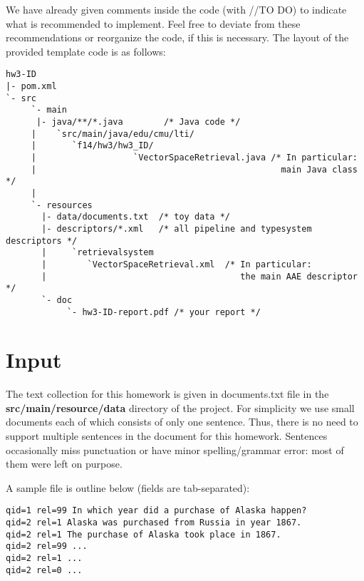 \documentclass[oneside,11pt]{memoir}
\begin{document}
We have already given comments inside the code (with //TO DO) to indicate what is recommended
to implement. Feel free to deviate from these recommendations
 or reorganize the code, if this is necessary.
The layout of the provided template code is as follows:

\vspace{2em}
\hspace{-3em}
\begin{minipage}{0.9\textwidth}
\footnotesize
\begin{verbatim}
hw3-ID
|- pom.xml
`- src
     `- main
      |- java/**/*.java        /* Java code */
     |    `src/main/java/edu/cmu/lti/
     |       `f14/hw3/hw3_ID/
     |                   `VectorSpaceRetrieval.java /* In particular:
     |                                                main Java class */
     |                           
     `- resources
       |- data/documents.txt  /* toy data */ 
       |- descriptors/*.xml   /* all pipeline and typesystem descriptors */
       |     `retrievalsystem
       |        `VectorSpaceRetrieval.xml  /* In particular: 
       |                                      the main AAE descriptor */
       `- doc
            `- hw3-ID-report.pdf /* your report */

\end{verbatim}
\normalsize
\end{minipage}



\section{Input}
The text collection for this homework is given in documents.txt file in 
the \textbf{src/main/resource/data} directory of the project. 
For simplicity we use small documents each of which consists of only one sentence.
Thus, there is no need to support multiple sentences in the document for this
homework.
Sentences occasionally miss punctuation or have minor spelling/grammar error:
most of them were left on purpose.

A sample file is outline below (fields are tab-separated):

\begin{verbatim}
qid=1 rel=99 In which year did a purchase of Alaska happen?
qid=2 rel=1 Alaska was purchased from Russia in year 1867.
qid=2 rel=1 The purchase of Alaska took place in 1867.
qid=2 rel=99 ...
qid=2 rel=1 ...
qid=2 rel=0 ...
\end{verbatim}
\end{document}
